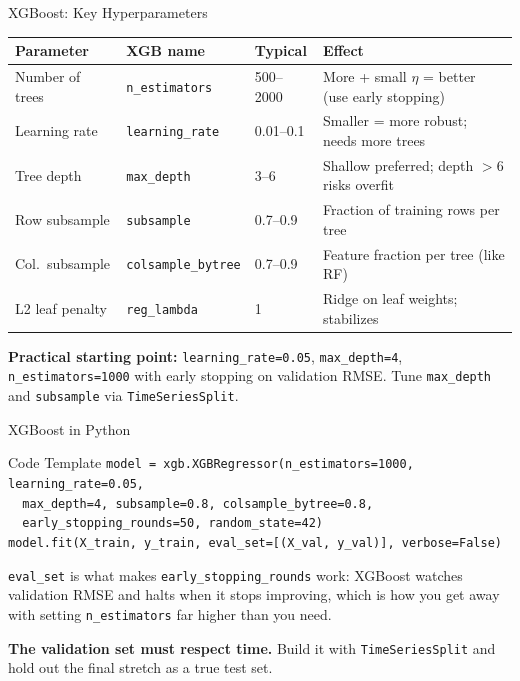 \documentclass[aspectratio=169, 11pt]{beamer}
\begin{document}
\begin{frame}{XGBoost: Key Hyperparameters}
  \begin{center}
    {\footnotesize
    \begin{tabular}{p{2.6cm}p{2.8cm}p{1.8cm}p{4.0cm}}
      \toprule
      \textbf{Parameter} & \textbf{XGB name} & \textbf{Typical} & \textbf{Effect} \\
      \midrule
      Number of trees & \texttt{n\_estimators} & 500--2000 & More + small $\eta$ = better (use early stopping) \\
      Learning rate & \texttt{learning\_rate} & 0.01--0.1 & Smaller = more robust; needs more trees \\
      Tree depth & \texttt{max\_depth} & 3--6 & Shallow preferred; depth $>$6 risks overfit \\
      Row subsample & \texttt{subsample} & 0.7--0.9 & Fraction of training rows per tree \\
      Col.\ subsample & \texttt{colsample\_bytree} & 0.7--0.9 & Feature fraction per tree (like RF) \\
      L2 leaf penalty & \texttt{reg\_lambda} & 1 & Ridge on leaf weights; stabilizes \\
      \bottomrule
    \end{tabular}
    }
  \end{center}
  \begin{keybox}
    \small \textbf{Practical starting point:}
    \texttt{learning\_rate=0.05}, \texttt{max\_depth=4},
    \texttt{n\_estimators=1000} with early stopping on validation RMSE.
    Tune \texttt{max\_depth} and \texttt{subsample} via \texttt{TimeSeriesSplit}.
  \end{keybox}
\end{frame}

\begin{frame}{XGBoost in Python}
  \begin{examplebox}{Code Template}
    {\scriptsize
    \texttt{model = xgb.XGBRegressor(n\_estimators=1000, learning\_rate=0.05,}\\
    \texttt{\ \ max\_depth=4, subsample=0.8, colsample\_bytree=0.8,}\\
    \texttt{\ \ early\_stopping\_rounds=50, random\_state=42)}\\
    \texttt{model.fit(X\_train, y\_train, eval\_set=[(X\_val, y\_val)], verbose=False)}
    }
  \end{examplebox}
  \texttt{eval\_set} is what makes \texttt{early\_stopping\_rounds} work: XGBoost watches
  validation RMSE and halts when it stops improving, which is how you get away with setting
  \texttt{n\_estimators} far higher than you need.

  \textbf{The validation set must respect time.} Build it with \texttt{TimeSeriesSplit} and
  hold out the final stretch as a true test set.

\end{frame}
\end{document}
